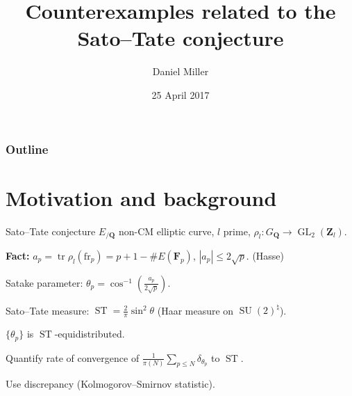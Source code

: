 \documentclass{beamer}
\title{Counterexamples related to the Sato--Tate conjecture}
\author{Daniel Miller}
\institute{Cornell University}
\date{25 April 2017}
\DeclareMathOperator{\GL}{GL}
\DeclareMathOperator{\ST}{ST}
\DeclareMathOperator{\SU}{SU}
\DeclareMathOperator{\tr}{tr}
\newcommand{\bF}{\mathbf{F}}
\newcommand{\bQ}{\mathbf{Q}}
\newcommand{\bZ}{\mathbf{Z}}
\newcommand{\frob}{\mathrm{fr}}
\begin{document}
\begin{frame}
\titlepage
\end{frame}



\begin{frame}
\frametitle{Outline}
\tableofcontents
\end{frame}





\section{Motivation and background}

\begin{frame}{Sato--Tate conjecture}
$E_{/\bQ}$ non-CM elliptic curve, $l$ prime, $\rho_l\colon G_\bQ \to \GL_2(\bZ_l)$. 
\pause

\textbf{Fact:}
$a_p = \tr\rho_l(\frob_p) = p+1 - \# E(\bF_p)$, 
\pause
$|a_p|\leqslant 2\sqrt p$. 
\pause
(Hasse) %
\pause

Satake parameter: $\theta_p = \cos^{-1}\left( \frac{a_p}{2\sqrt p}\right)$. 
\pause

Sato--Tate measure: $\ST = \frac{2}{\pi} \sin^2 \theta$ 
\pause
(Haar measure on $\SU(2)^\natural$). 
\pause

\begin{theorem}[Taylor et.~al.]
$\{\theta_p\}$ is $\ST$-equidistributed. 
\end{theorem}
\pause

Quantify rate of convergence of 
$\frac{1}{\pi(N)} \sum_{p\leqslant N} \delta_{\theta_p}$ to $\ST$. 
\pause

Use discrepancy (Kolmogorov--Smirnov statistic). 
\end{frame}
\end{document}
